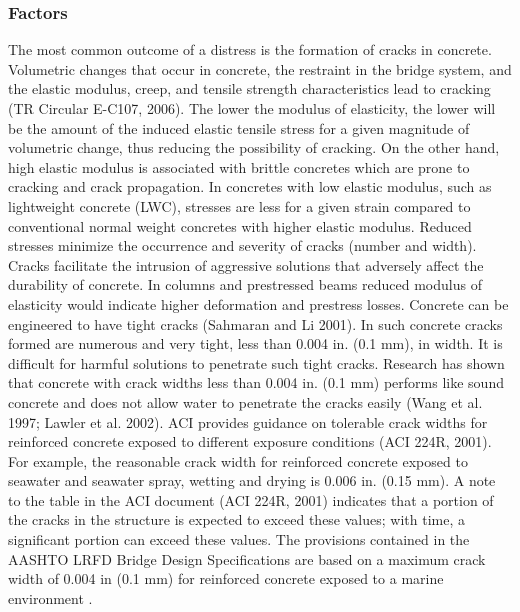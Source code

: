\subsubsection{Factors}
The most common outcome of a distress is the formation of cracks in concrete. Volumetric changes that occur in concrete, the restraint in the bridge system, and the elastic modulus, creep, and tensile strength characteristics lead to cracking (TR Circular E-C107, 2006). The lower the modulus of elasticity, the lower will be the amount of the induced elastic tensile stress for a given magnitude of volumetric change, thus reducing the possibility of cracking. On the other hand, high elastic modulus is associated with brittle concretes which are prone to cracking and crack propagation. In concretes with low elastic modulus, such as lightweight concrete (LWC), stresses are less for a given strain compared to conventional normal weight concretes with higher elastic modulus. Reduced stresses minimize the occurrence and severity of cracks (number and width). Cracks facilitate the intrusion of aggressive solutions that adversely affect the durability of concrete. In columns and prestressed beams reduced modulus of elasticity would indicate higher deformation and prestress losses. Concrete can be engineered to have tight cracks (Sahmaran and Li 2001). In such concrete cracks formed are numerous and very tight, less than 0.004 in. (0.1 mm), in width. It is difficult for harmful solutions to penetrate such tight cracks. Research has shown that concrete with crack widths less than 0.004 in. (0.1 mm) performs like sound concrete and does not allow water to penetrate the cracks easily (Wang et al. 1997; Lawler et al. 2002). ACI provides guidance on tolerable crack widths for reinforced concrete exposed to different exposure conditions (ACI 224R, 2001). For example, the reasonable crack width for reinforced concrete exposed to seawater and seawater spray, wetting and drying is 0.006 in. (0.15 mm). A note to the table in the ACI document (ACI 224R, 2001) indicates that a portion of the cracks in the structure is expected to exceed these values; with time, a significant portion can exceed these values. The provisions contained in the AASHTO LRFD Bridge Design Specifications are based on a maximum crack width of 0.004 in (0.1 mm) for reinforced concrete exposed to a marine environment \cite{aashto2012l}.

